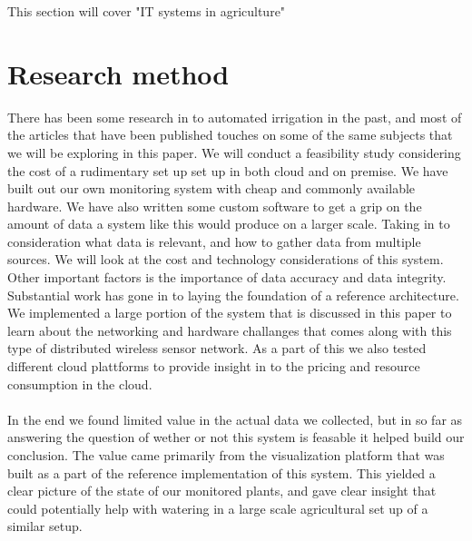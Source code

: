 \documentclass[]{uiophd}
\begin{document}
This section will cover "IT systems in agriculture"

\section{Research method}
There has been some research in to automated irrigation in the past, and most of the articles that have been published touches on some of the same subjects that we will be exploring in this paper. We will conduct a feasibility study considering the cost of a rudimentary set up set up in both cloud and on premise. We have built out our own monitoring system with cheap and commonly available hardware. We have also written some custom software to get a grip on the amount of data a system like this would produce on a larger scale. Taking in to consideration what data is relevant, and how to gather data from multiple sources. We will look at the cost and technology considerations of this system. Other important factors is the importance of data accuracy and data integrity. Substantial work has gone in to laying the foundation of a reference architecture. We implemented a large portion of the system that is discussed in this paper to learn about the networking and hardware challanges that comes along with this type of distributed wireless sensor network. As a part of this we also tested different cloud plattforms to provide insight in to the pricing and resource consumption in the cloud. 
\\\\
In the end we found limited value in the actual data we collected, but in so far as answering the question of wether or not this system is feasable it helped build our conclusion. The value came primarily from the visualization platform that was built as a part of the reference implementation of this system. This yielded a clear picture of the state of our monitored plants, and gave clear insight that could potentially help with watering in a large scale agricultural set up of a similar setup.
\end{document}
